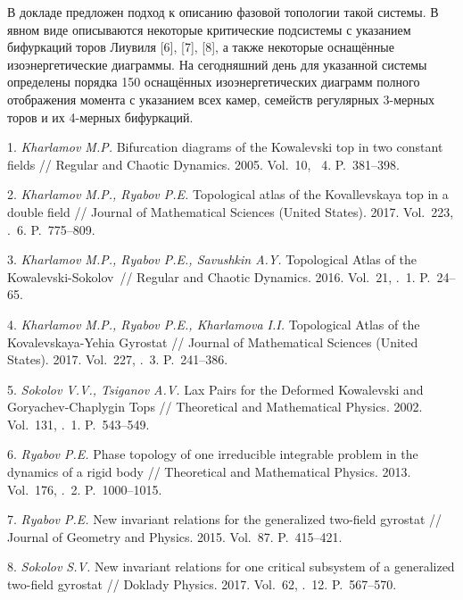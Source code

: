 
В докладе предложен подход к описанию фазовой топологии такой системы. В явном виде описываются некоторые критические подсистемы с указанием бифуркаций торов Лиувиля [6], [7], [8], а также некоторые оснащённые изоэнергетические диаграммы. На сегодняшний день для указанной системы определены порядка 150 оснащённых изоэнергетических диаграмм полного отображения момента с указанием всех камер, семейств регулярных 3-мерных торов и их 4-мерных бифуркаций.



\litlist

1. {\it Kharlamov M.P.} Bifurcation diagrams of the Kowalevski top in two constant fields // Regular and Chaotic Dynamics. 2005. Vol.~10, \No~4. P.~381--398.

2. {\it Kharlamov M.P., Ryabov P.E.} Topological atlas of the Kovallevskaya
top in a double field // Journal of Mathematical Sciences (United
States). 2017. Vol.~223, \No.~6. P.~775--809.

3. {\it Kharlamov M.P., Ryabov P.E., Savushkin A.Y.} Topologi\-cal Atlas of the
Kowalevski-Sokolov~// Regular and Chaotic Dynamics. 2016. Vol.~21, \No.~1. P.~24--65.

4. {\it Kharlamov M.P., Ryabov P.E., Kharlamova I.I.} Topo\-lo\-gical At\-las of the Kovalevskaya-Yehia Gyrostat // Journal of Mathe\-ma\-tical Sciences (United States). 2017. Vol.~227, \No.~3. P.~241--386.

5. {\it Sokolov V.V., Tsiganov A.V.} Lax Pairs for the Deformed Kowalevski and Goryachev-Chaplygin Tops // Theoretical and Mathematical Physics. 2002. Vol.~131, \No.~1. P.~543--549.

6. {\it Ryabov P.E.} Phase topology of one irreducible integrable problem in the dynamics of a rigid body // Theoretical and Mathematical Physics. 2013. Vol.~176, \No.~2. P.~1000--1015.

7. {\it Ryabov P.E.} New invariant relations for the generalized two-field gyrostat // Journal of Geometry and Physics. 2015. Vol.~87. P.~415--421.

8. {\it Sokolov S.V.} New invariant relations for one critical sub\-system of a generalized two-field gyrostat // Doklady Physics. 2017. Vol.~62, \No.~12. P.~567--570.
